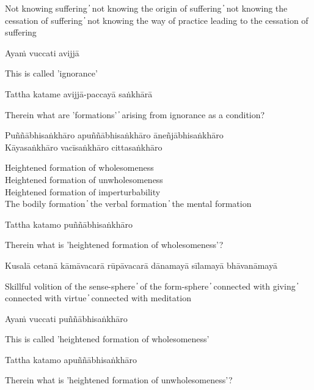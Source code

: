 \begin{cprenglish}
Not knowing suffering  ̓  not knowing the origin of suffering  ̓  not knowing the cessation of suffering  ̓  not knowing the way of practice leading to the cessation of suffering
\end{cprenglish}

Ayaṁ vuccati avijjā

\begin{cprenglish}
This is called 'ignorance'
\end{cprenglish}

Tattha katame avijjā-paccayā saṅkhārā

\begin{cprenglish}
Therein what are 'formations'  ̓  arising from ignorance as a condition?
\end{cprenglish}

Puññābhisaṅkhāro apuññābhisaṅkhāro āneñjābhisaṅkhāro\\
Kāyasaṅkhāro vacīsaṅkhāro cittasaṅkhāro

\begin{cprenglish}
Heightened formation of wholesomeness\\
Heightened formation of unwholesomeness\\
Heightened formation of imperturbability\\
The bodily formation  ̓  the verbal formation  ̓  the mental formation
\end{cprenglish}

Tattha katamo puññābhisaṅkhāro

\begin{cprenglish}
Therein what is 'heightened formation of wholesomeness'?
\end{cprenglish}

Kusalā cetanā kāmāvacarā rūpāvacarā dānamayā sīlamayā bhāvanāmayā

\begin{cprenglish}
Skillful volition of the sense-sphere  ̓  of the form-sphere  ̓  connected with giving  ̓  connected with virtue  ̓  connected with meditation
\end{cprenglish}

Ayaṁ vuccati puññābhisaṅkhāro

\begin{cprenglish}
This is called 'heightened formation of wholesomeness'
\end{cprenglish}

Tattha katamo apuññābhisaṅkhāro

\begin{cprenglish}
Therein what is 'heightened formation of unwholesomeness'?
\end{cprenglish}


